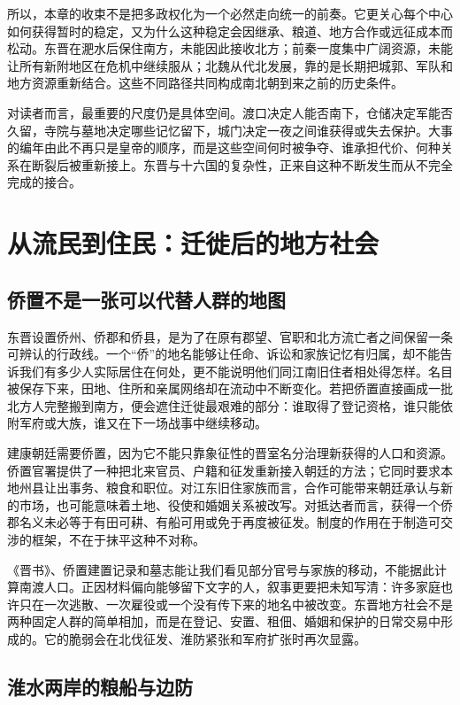 所以，本章的收束不是把多政权化为一个必然走向统一的前奏。它更关心每个中心如何获得暂时的稳定，又为什么这种稳定会因继承、粮道、地方合作或远征成本而松动。东晋在淝水后保住南方，未能因此接收北方；前秦一度集中广阔资源，未能让所有新附地区在危机中继续服从；北魏从代北发展，靠的是长期把城郭、军队和地方资源重新结合。这些不同路径共同构成南北朝到来之前的历史条件。

对读者而言，最重要的尺度仍是具体空间。渡口决定人能否南下，仓储决定军能否久留，寺院与墓地决定哪些记忆留下，城门决定一夜之间谁获得或失去保护。大事的编年由此不再只是皇帝的顺序，而是这些空间何时被争夺、谁承担代价、何种关系在断裂后被重新接上。东晋与十六国的复杂性，正来自这种不断发生而从不完全完成的接合。

\section{从流民到住民：迁徙后的地方社会}

\subsection{侨置不是一张可以代替人群的地图}

东晋设置侨州、侨郡和侨县，是为了在原有郡望、官职和北方流亡者之间保留一条可辨认的行政线。一个“侨”的地名能够让任命、诉讼和家族记忆有归属，却不能告诉我们有多少人实际居住在何处，更不能说明他们同江南旧住者相处得怎样。名目被保存下来，田地、住所和亲属网络却在流动中不断变化。若把侨置直接画成一批北方人完整搬到南方，便会遮住迁徙最艰难的部分：谁取得了登记资格，谁只能依附军府或大族，谁又在下一场战事中继续移动。

建康朝廷需要侨置，因为它不能只靠象征性的晋室名分治理新获得的人口和资源。侨置官署提供了一种把北来官员、户籍和征发重新接入朝廷的方法；它同时要求本地州县让出事务、粮食和职位。对江东旧住家族而言，合作可能带来朝廷承认与新的市场，也可能意味着土地、役使和婚姻关系被改写。对抵达者而言，获得一个侨郡名义未必等于有田可耕、有船可用或免于再度被征发。制度的作用在于制造可交涉的框架，不在于抹平这种不对称。

《晋书》、侨置建置记录和墓志能让我们看见部分官号与家族的移动，不能据此计算南渡人口。正因材料偏向能够留下文字的人，叙事更要把未知写清：许多家庭也许只在一次逃散、一次雇役或一个没有传下来的地名中被改变。东晋地方社会不是两种固定人群的简单相加，而是在登记、安置、租佃、婚姻和保护的日常交易中形成的。它的脆弱会在北伐征发、淮防紧张和军府扩张时再次显露。

\subsection{淮水两岸的粮船与边防}

